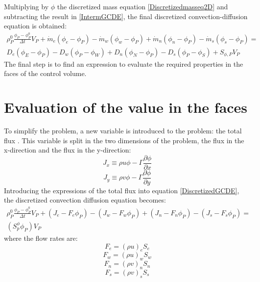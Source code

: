 Multiplying by $\phi$ the discretized mass equation \ref{Discretizedmasseq2D} and subtracting the result in \ref{IntermGCDE}, the final discretized convection-diffusion equation is obtained:
\begin{multline}
\rho_{P}^{0}\frac{\phi_{P}-\phi_{P}^{0}}{\Delta t}V_{P}+\dot{m}_{e}\left(\phi_{e}-\phi_{P}\right)-\dot{m}_{w}\left(\phi_{w}-\phi_{P}\right)+\dot{m}_{n}\left(\phi_{n}-\phi_{P}\right)-\dot{m}_{s}\left(\phi_{s}-\phi_{P}\right)= \\
D_{e}\left(\phi_{E}-\phi_{P}\right)-D_{w}\left(\phi_{P}-\phi_{W}\right)+D_{n}\left(\phi_{N}-\phi_{P}\right)-D_{s}\left(\phi_{P}-\phi_{S}\right)+S_{\phi,P}V_{P}
\label{DiscretizedGCDE}
\end{multline}
The final step is to find an expression to evaluate the required properties in the faces of the control volume.

\section{Evaluation of the value in the faces}
To simplify the problem, a new variable is introduced to the problem: the total flux \cite{Patankar1980}. This variable is split in the two dimensions of the problem, the flux in the x-direction and the flux in the y-direction:
\begin{equation}
J_{x}\equiv\rho u\phi-\Gamma\frac{\partial\phi}{\partial x}
\end{equation}
\begin{equation}
J_{y}\equiv\rho v\phi-\Gamma\frac{\partial\phi}{\partial y}
\end{equation}
Introducing the expressions of the total flux into equation \ref{DiscretizedGCDE}, the discretized convection diffusion equation becomes:
\begin{multline}
\rho_{P}^{0}\frac{\phi_{P}-\phi_{P}^{0}}{\Delta t}V_{P}+\left(J_{e}-F_{e}\phi_{P}\right)-\left(J_{w}-F_{w}\phi_{P}\right)+\left(J_{n}-F_{n}\phi_{P}\right)-\left(J_{s}-F_{s}\phi_{P}\right)= \\
\left(S_{p}^{\phi}\phi_{P}\right)V_{P}
\label{FinalDiscrGCDE}
\end{multline}
where the flow rates are:
\begin{equation}
F_{e}=\left(\rho u\right)_{e}S_{e}
\end{equation}
\begin{equation}
F_{w}=\left(\rho u\right)_{w}S_{w}
\end{equation}
\begin{equation}
F_{n}=\left(\rho v\right)_{n}S_{n}
\end{equation}
\begin{equation}
F_{s}=\left(\rho v\right)_{s}S_{s}
\end{equation}

